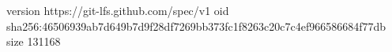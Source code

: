version https://git-lfs.github.com/spec/v1
oid sha256:46506939ab7d649b7d9f28df7269bb373fc1f8263c20c7c4ef966586684f77db
size 131168
